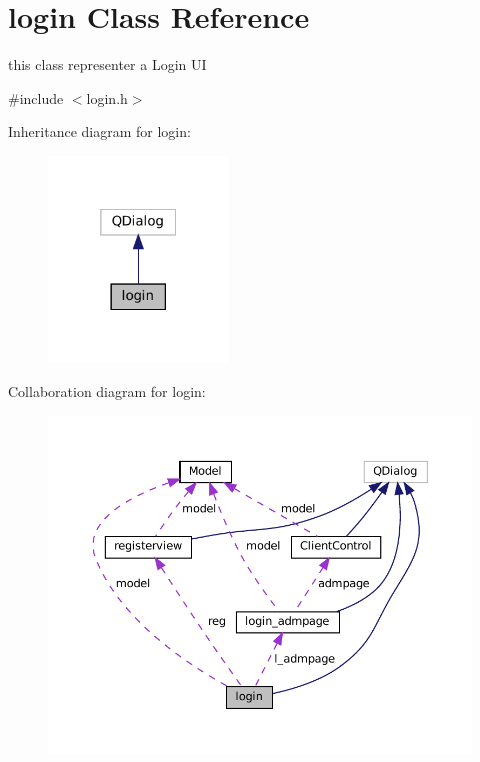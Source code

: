 \hypertarget{classlogin}{}\section{login Class Reference}
\label{classlogin}


this class representer a Login UI  




{\ttfamily \#include $<$login.\+h$>$}



Inheritance diagram for login\+:
\nopagebreak
\begin{figure}[H]
\begin{center}
\leavevmode
\includegraphics[width=136pt]{classlogin__inherit__graph}
\end{center}
\end{figure}


Collaboration diagram for login\+:
\nopagebreak
\begin{figure}[H]
\begin{center}
\leavevmode
\includegraphics[width=350pt]{classlogin__coll__graph}
\end{center}
\end{figure}
